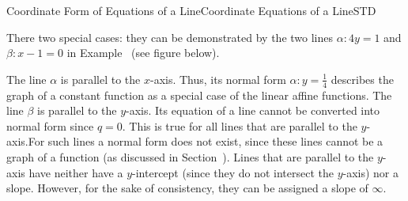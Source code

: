 \begin{MXContent}{Coordinate Form of Equations of a Line}{Coordinate Equations of a Line}{STD}
\begin{MExample}
\begin{center}
{\begin{tikzpicture}
\end{tikzpicture}
}
\end{center}
\end{MExample}

There two special cases: they can be demonstrated by the two 
lines $\alpha\colon 4y=1$ and $\beta\colon x-1=0$ in Example~ (see figure below).

 \begin{center}
\end{center}

 \begin{center}
\end{center}

The line $\alpha$ is parallel to the $x$-axis. Thus, its normal form $\alpha\colon y=\frac{1}{4}$ describes the 
graph of a constant function as a special case of the linear affine functions. The line $\beta$ is parallel 
to the $y$-axis. Its equation of a line cannot be converted into normal form since $q=0$. This is true for all lines
that are parallel to the $y$-axis.For such lines a normal form does not exist, since these lines cannot be 
a graph of a function (as discussed in Section~). Lines that are parallel to the $y$-axis have neither 
have a $y$-intercept (since they do not intersect the $y$-axis) nor a slope. However, 
for the sake of consistency, they can be assigned a slope of $\infty$.


\end{MXContent}
